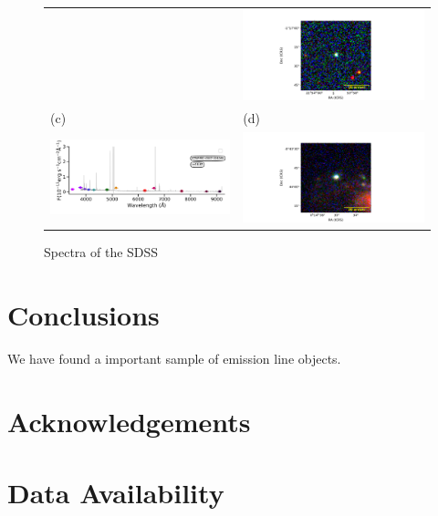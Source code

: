\documentclass[fleqn,usenatbib]{mnras}
\begin{document}
\begin{figure}
\begin{tabular}{ll}
    & \includegraphics[width=0.4\linewidth, trim=10 0 10 20, clip]{Figs/STRIPE82-0147-005730_343-1_100_r.pdf} \\
    (c) & (d) \\
    \includegraphics[trim=10 0 10 20, clip]{Figs/spec-1089-52913-0196-STRIPE82-0007-024265.pdf}
    & \includegraphics[width=0.4\linewidth, trim=10 0 10 20, clip]{Figs/STRIPE82-0007-024265_3-0_100_r.pdf} \\
  \end{tabular}
  \caption{Spectra of the SDSS}
  \label{fig:color-diagram}
\end{figure}

\section{Conclusions}

We have found a important sample of emission line objects.

\section*{Acknowledgements}


\section*{Data Availability}
\end{document}
